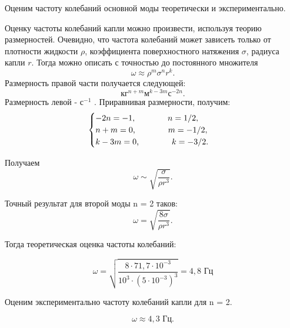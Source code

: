 \documentclass[a4paper,12pt]{article} %
\begin{document}
\medskip

\noindent Оценим частоту колебаний основной моды теоретически и экспериментально.

\medskip

\noindent Оценку частоты колебаний капли можно произвести, используя теорию размерностей. Очевидно, что частота колебаний может зависеть только от плотности жидкости $\rho$, коэффициента поверхностного натяжения $\sigma$, радиуса капли $r$. Тогда можно описать с точностью до постоянного множителя
$$\omega \approx \rho^m \sigma^n r^k . $$
\noindent Размерность правой части получается следующей:
$$ {\text{кг}}^{n+m} {\text{м}}^{k-3m} {\text{с}}^{-2n} . $$
\noindent Размерность левой - ${\text{с}}^{-1}$ . Приравнивая размерности, получим:
\begin{equation*}
 \begin{cases}
   -2n = -1\text,\qquad \qquad n = 1/2,\\
   n + m = 0 \text,\qquad \qquad m = -1/2,\\
   k - 3m = 0 \text,\qquad \qquad k = -3/2.
 \end{cases}
\end{equation*}

\noindent Получаем
$$\omega \sim \sqrt{\frac{\sigma}{\rho r^3}} .$$

\medskip

\noindent Точный результат для второй моды n = 2 таков:
$$\omega = \sqrt{\frac{8 \sigma}{\rho r^3}} .$$

\noindent Тогда теоретическая оценка частоты колебаний: 

$$ \omega = \sqrt{\frac{8 \cdot 71,7 \cdot 10^{-3}}{10^3 \cdot (5 \cdot 10^{-3})^3}} = 4,8 \text{ Гц} $$

\medskip

\noindent Оценим экспериментально частоту колебаний капли для n = 2.

$$ \omega \approx 4,3 \text{ Гц}. $$
\end{document}
